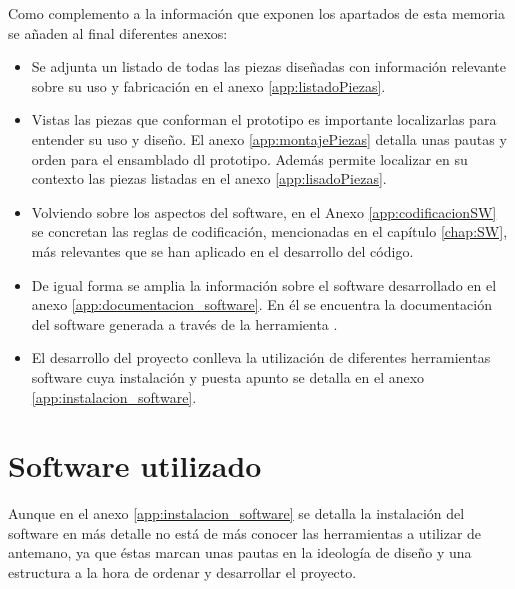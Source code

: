 Como complemento a la información que exponen los apartados de esta memoria se añaden al final diferentes anexos:

\begin{itemize}
    \item Se adjunta un listado de todas las piezas diseñadas con información relevante sobre su uso y fabricación en el anexo \ref{app:listadoPiezas}.
    \item Vistas las piezas que conforman el prototipo es importante localizarlas para entender su uso y diseño. El anexo \ref{app:montajePiezas} detalla unas pautas y orden para el ensamblado dl prototipo. Además permite localizar en su contexto las piezas listadas en el anexo \ref{app:lisadoPiezas}.
    \item Volviendo sobre los aspectos del software, en el Anexo \ref{app:codificacionSW} se concretan las reglas de codificación, mencionadas en el capítulo \ref{chap:SW}, más relevantes que se han aplicado en el desarrollo del código.
    \item De igual forma se amplia la información sobre el software desarrollado en el anexo \ref{app:documentacion_software}. En él se encuentra la documentación del software generada a través de la herramienta .
    \item El desarrollo del proyecto conlleva la utilización de diferentes herramientas software cuya instalación y puesta apunto se detalla en el anexo \ref{app:instalacion_software}.
\end{itemize}

\section{Software utilizado}

Aunque en el anexo \ref{app:instalacion_software} se detalla la instalación del software en más detalle no está de más conocer las herramientas a utilizar de antemano, ya que éstas marcan unas pautas en la ideología de diseño y una estructura a la hora de ordenar y desarrollar el proyecto.

